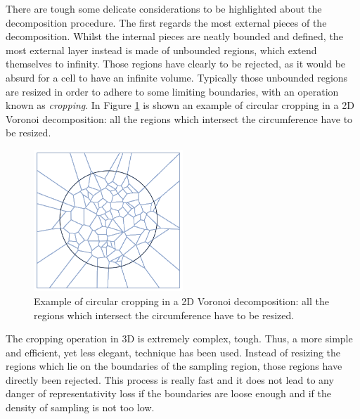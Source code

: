     There are tough some delicate considerations to be highlighted about the decomposition procedure. The first regards the most external pieces of the decomposition. Whilst the internal pieces are neatly bounded and defined, the most external layer instead is made of unbounded regions, which extend themselves to infinity. Those regions have clearly to be rejected, as it would be absurd for a cell to have an infinite volume. Typically those unbounded regions are resized in order to adhere to some limiting boundaries, with an operation known as \textit{cropping}. In Figure \ref{fig:crop_vor} is shown an example of circular cropping in a 2D Voronoi decomposition: all the regions which intersect the circumference have to be resized.

    \begin{figure}
        \centering
        \includegraphics[width = 0.5\textwidth]{images/crop_vor}
        \caption{Example of circular cropping in a 2D Voronoi decomposition: all the regions which intersect the circumference have to be resized.}
        \label{fig:crop_vor}
    \end{figure}

    The cropping operation in 3D is extremely complex, tough. Thus, a more simple and efficient, yet less elegant, technique has been used. Instead of resizing the regions which lie on the boundaries of the sampling region, those regions have directly been rejected. This process is really fast and it does not lead to any danger of representativity loss if the boundaries are loose enough and if the density of sampling is not too low.

